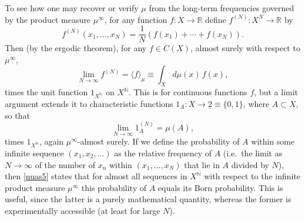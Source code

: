 \documentclass[11pt,a4paper]{article}
\numberwithin{equation}{section}
\newcommand{\er}{\eqref}
\newcommand{\ul}{\underline}
\newcommand{\raw}{\rightarrow}
\newcommand{\la}{\langle} \newcommand{\ra}{\rangle}
\newcommand{\N}{{\mathbb N}} \newcommand{\R}{{\mathbb R}}
\begin{document}
To see how one may recover or verify $\mu$ from the long-term frequencies governed by the product measure $\mu^{\infty}$, for any function $f:X\raw\R$ define  $f^{(N)}:X^N\raw\R$ by 
\begin{equation}
f^{(N)}(x_1, \ldots, x_N)=\frac{1}{N}(f(x_1)+\cdots + f(x_N)). \label{fN}
\end{equation}
Then (by the ergodic theorem), for any $f\in C(X)$, almost surely with respect to $\mu^{\infty}$,
\begin{equation}
\lim_{N\raw\infty}f^{(N)}=\la f\ra_{\mu} \equiv \int_{X}d\mu(x)\, f(x)
,\label{nuas3}
\end{equation}
times  the unit function $1_{X^{\N}}$ on  $X^{\N}$. This is  for continuous functions $f$, but
a limit argument extends it to characteristic functions $1_A:X\raw\ul{2}\equiv \{0,1\}$, where $A\subset X$, so that  
\begin{equation}
\lim_{N\raw\infty} 1_A^{(N)}= \mu(A),  \label{nuas5}
\end{equation}
times $1_{X^{\N}}$, again $\mu^{\infty}$-almost surely. If we define the probability of $A$ within some infinite sequence $(x_1, x_2, \ldots)$ as the relative frequency of $A$ (i.e.\ the limit as $N\raw\infty$ of the number of $x_n$ within $(x_1, \ldots, x_N)$ that lie in $A$ divided by $N$),
then \er{nuas5} states that for almost all sequences  in $X^{\N}$ 
 with respect to the infinite product measure $\mu^{\infty}$
 this probability of $A$ equals its Born probability. This is  useful, since the latter is a purely mathematical quantity, whereas the former is experimentally accessible (at least for large $N$).
 
\end{document}

